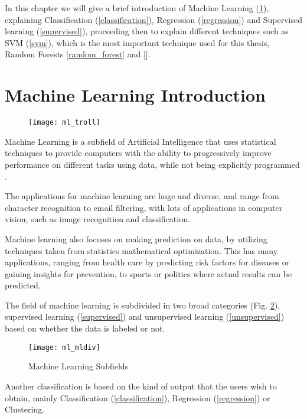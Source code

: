 In this chapter we will give a brief introduction of Machine Learning (\ref{ml}), explaining Classification (\ref{classification}), Regression (\ref{regression}) and Supervised learning (\ref{supervised}), proceeding then to explain different techniques such as SVM (\ref{svm}), which is the most important technique used for this thesis, Random Forests \ref{random_forest} and [].

\section{Machine Learning Introduction} \label{ml}

\begin{figure}[H]
	\centering
	\texttt{[image: ml\_troll]}
	\label{fig:ml_troll}
\end{figure}

Machine Learning is a subfield of Artificial Intelligence that uses statistical techniques to provide computers with the ability to progressively improve performance on different tasks using data, while not being explicitly programmed \cite{wiki:ml}.

The applications for machine learning are huge and diverse, and range from character recognition to email filtering, with lots of applications in computer vision, such as image recognition and classification.

Machine learning also focuses on making prediction on data, by utilizing techniques taken from statistics  mathematical optimization. This has many applications, ranging from health care by predicting risk factors for diseases or gaining insights for prevention, to sports or politics where actual results can be predicted.

The field of machine learning is subdivided in two broad categories (Fig. \ref{fig:ml_mldiv}), supervised learning (\ref{supervised}) and unsupervised learning (\ref{unsupervised}) based on whether the data is labeled or not.

\begin{figure}[H]
	\centering
	\texttt{[image: ml\_mldiv]}
	\caption{Machine Learning Subfields \cite{ml_mldiv}}
	\label{fig:ml_mldiv}
\end{figure}

Another classification is based on the kind of output that the users wish to obtain, mainly Classification (\ref{classification}), Regression (\ref{regression}) or Clustering.

